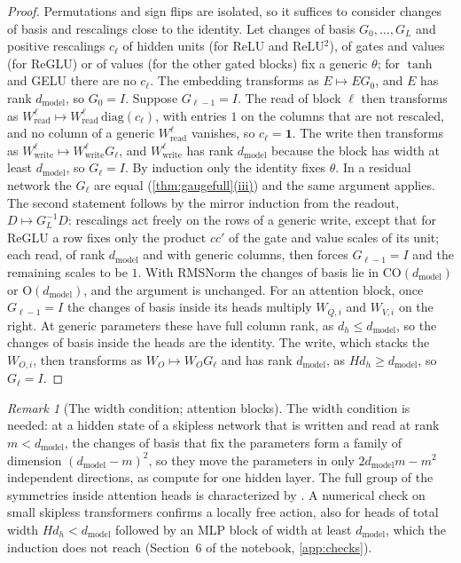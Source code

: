 \documentclass[10pt]{article}
\theoremstyle{definition}
\theoremstyle{remark}
\newtheorem{remark}[theorem]{Remark}
\newcommand{\Wread}{W_{\mathrm{read}}}
\newcommand{\Wwrite}{W_{\mathrm{write}}}
\newcommand{\dm}{d_{\mathrm{model}}}
\newcommand{\Ort}{\mathrm{O}}
\newcommand{\CO}{\mathrm{CO}}
\DeclareRobustCommand{\cpref}[2]{\hyperref[#1:#2]{\cref*{#1}(#2)}}
\begin{document}
\begin{proof}
Permutations and sign flips are isolated, so it suffices to consider changes of basis and rescalings close to the identity. Let changes of basis $G_0, \dots, G_L$ and positive rescalings $c_\ell$ of hidden units (for ReLU and ReLU$^2$), of gates and values (for ReGLU) or of values (for the other gated blocks) fix a generic $\theta$; for $\tanh$ and GELU there are no $c_\ell$. The embedding transforms as $E \mapsto EG_0$, and $E$ has rank $\dm$, so $G_0 = I$. Suppose $G_{\ell-1} = I$. The read of block $\ell$ then transforms as $\Wread^\ell \mapsto \Wread^\ell\,\mathrm{diag}(c_\ell)$, with entries $1$ on the columns that are not rescaled, and no column of a generic $\Wread^\ell$ vanishes, so $c_\ell = \mathbf 1$. The write then transforms as $\Wwrite^\ell \mapsto \Wwrite^\ell G_\ell$, and $\Wwrite^\ell$ has rank $\dm$ because the block has width at least $\dm$, so $G_\ell = I$. By induction only the identity fixes $\theta$. In a residual network the $G_\ell$ are equal (\cpref{thm:gaugefull}{iii}) and the same argument applies. The second statement follows by the mirror induction from the readout, $D \mapsto G_L^{-1}D$: rescalings act freely on the rows of a generic write, except that for ReGLU a row fixes only the product $cc'$ of the gate and value scales of its unit; each read, of rank $\dm$ and with generic columns, then forces $G_{\ell-1} = I$ and the remaining scales to be $1$. With RMSNorm the changes of basis lie in $\CO(\dm)$ or $\Ort(\dm)$, and the argument is unchanged. For an attention block, once $G_{\ell-1} = I$ the changes of basis inside its heads multiply $W_{Q,i}$ and $W_{V,i}$ on the right. At generic parameters these have full column rank, as $d_h \le \dm$, so the changes of basis inside the heads are the identity. The write, which stacks the $W_{O,i}$, then transforms as $W_O \mapsto W_OG_\ell$ and has rank $\dm$, as $Hd_h \ge \dm$, so $G_\ell = I$.
\end{proof}

\begin{remark}[The width condition; attention blocks]\label{rem:attnfree}
The width condition is needed: at a hidden state of a skipless network that is written and read at rank $m < \dm$, the changes of basis that fix the parameters form a family of dimension $(\dm-m)^2$, so they move the parameters in only $2\dm m - m^2$ independent directions, as \citet[Proposition~C.3]{zhao2023symmetries} compute for one hidden layer. The full group of the symmetries inside attention heads is characterized by \citet{wang2025gauge}. A numerical check on small skipless transformers confirms a locally free action, also for heads of total width $Hd_h < \dm$ followed by an MLP block of width at least $\dm$, which the induction does not reach (Section~6 of the notebook, \cref{app:checks}).
\end{remark}
\end{document}
